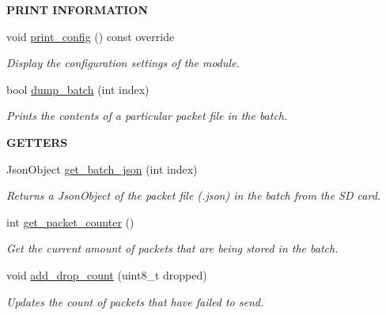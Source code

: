 \begin{Indent}{\bf P\+R\+I\+NT I\+N\+F\+O\+R\+M\+A\+T\+I\+ON}\par
\begin{DoxyCompactItemize}
\item 
void \hyperlink{class_loom___batch_s_d_ad1566bbb55d145e3206784df245be710}{print\+\_\+config} () const override
\begin{DoxyCompactList}\small\item\em Display the configuration settings of the module. \end{DoxyCompactList}\item 
bool \hyperlink{class_loom___batch_s_d_acc8306e790e9068ad418add3186e0aa7}{dump\+\_\+batch} (int index)
\begin{DoxyCompactList}\small\item\em Prints the contents of a particular packet file in the batch. \end{DoxyCompactList}\end{DoxyCompactItemize}
\end{Indent}
\begin{Indent}{\bf G\+E\+T\+T\+E\+RS}\par
\begin{DoxyCompactItemize}
\item 
Json\+Object \hyperlink{class_loom___batch_s_d_af58cee5d0d99bc8e78ade04e0c89baf4}{get\+\_\+batch\+\_\+json} (int index)
\begin{DoxyCompactList}\small\item\em Returns a Json\+Object of the packet file (.json) in the batch from the SD card. \end{DoxyCompactList}\item 
int \hyperlink{class_loom___batch_s_d_a97ce51f073f6b4c8394f830edcfd3198}{get\+\_\+packet\+\_\+counter} ()
\begin{DoxyCompactList}\small\item\em Get the current amount of packets that are being stored in the batch. \end{DoxyCompactList}\item 
void \hyperlink{class_loom___batch_s_d_abf19bc992530ae56cd658661926fb2f3}{add\+\_\+drop\+\_\+count} (uint8\+\_\+t dropped)
\begin{DoxyCompactList}\small\item\em Updates the count of packets that have failed to send. \end{DoxyCompactList}\end{DoxyCompactItemize}
\end{Indent}
